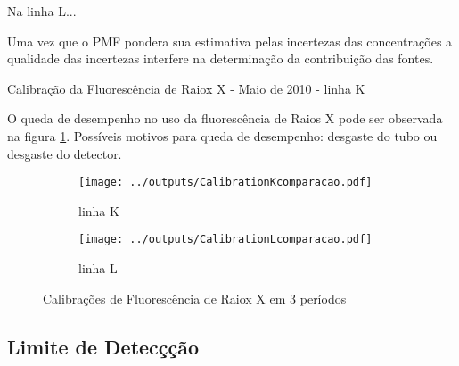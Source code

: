 Na linha L...

Uma vez que o PMF pondera sua estimativa pelas incertezas das concentrações a
qualidade das incertezas interfere na determinação da contribuição das fontes.

\begin{landscape}
\begin{table}[H]
  \small
  \centering
    
  \caption{Calibração da Fluorescência de Raiox X - Maio de 2010 - linha K
  \label{table:edxAllCalibration}}
\end{table}
\end{landscape}

\begin{table}[H]
  \begin{footnotesize} %
  
  \end{footnotesize}
\end{table}

%  

O queda de desempenho no uso da fluorescência de Raios X pode ser observada 
na figura \ref{fig:compara_calibracao}. 
Possíveis motivos para queda de desempenho: desgaste do tubo ou desgaste do detector. 

\begin{figure}[H]
  \begin{subfigure}[b]{0.5\textwidth}
    \texttt{[image: ../outputs/CalibrationKcomparacao.pdf]}
    \caption{linha K}
  \end{subfigure}%
  \begin{subfigure}[b]{0.5\textwidth}
    \texttt{[image: ../outputs/CalibrationLcomparacao.pdf]}
    \caption{linha L}
  \end{subfigure}
  \caption{Calibrações de Fluorescência de Raiox X em 3 períodos \label{fig:compara_calibracao}}
\end{figure}

\subsection{Limite de Detecçção}

